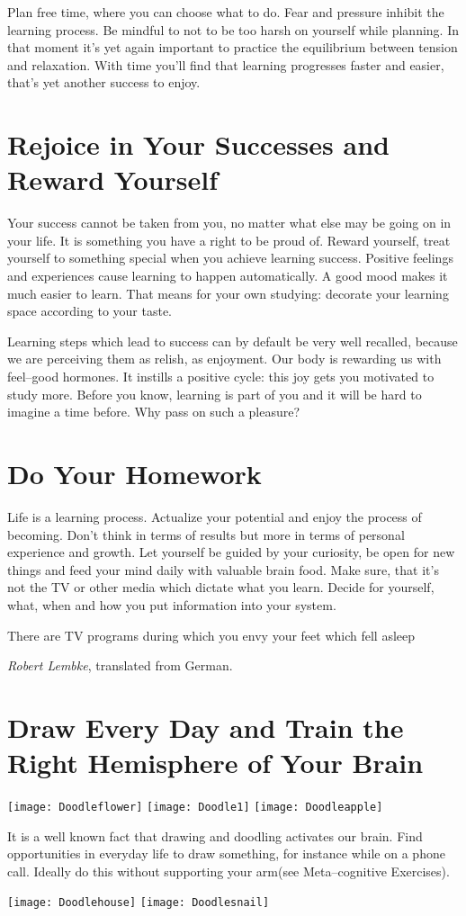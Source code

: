 \documentclass[../main.tex]{subfiles}
\begin{document}
 Plan {free time}, where you can choose what to do. {Fear and pressure inhibit the learning process}. Be mindful to not to be too harsh on yourself while planning. In that moment it's yet again important to practice the equilibrium between tension and relaxation. With time you'll find that learning progresses faster and easier, that's yet another success to enjoy.

 \section[Rejoice and Reward]{Rejoice in Your Successes and Reward Yourself}
 
{Your success cannot be taken from you, no matter what else may be going on in your life.}
It is something you have a right to be proud of. 
 Reward yourself, treat yourself to {something special} when you achieve learning success.
 {Positive feelings and experiences} cause learning to happen automatically.
 A {good mood} makes it much easier to learn. 
That means for your own studying: {decorate your learning space according to your taste.}

Learning steps which lead to success can by default be very well recalled, because we are perceiving them as relish, as enjoyment. Our body is rewarding us with feel--good hormones. It instills a positive cycle: this joy gets you motivated to study more. Before you know, learning is part of you and it will be hard to imagine a time before. Why pass on such a pleasure?

\section{Do Your Homework}

{Life is a learning process}.
{Actualize your potential} and enjoy the process of becoming. 
Don't think in terms of results but more in terms of {personal experience} and {growth}.
Let yourself be guided by your {curiosity}, be {open for new things} and {feed your mind} daily with valuable brain food. 
Make sure, that it's not the TV or other media which dictate what you learn. {Decide for yourself}, what, when and how you put information into your system.

\epigraph{There are TV programs during which you envy your feet which fell asleep}{\textit{Robert Lembke}, translated from German.}

\section[Draw]{Draw Every Day and Train the Right Hemisphere of Your Brain}


\texttt{[image: Doodleflower]}
\texttt{[image: Doodle1]}
\texttt{[image: Doodleapple]}


{It is a well known fact that {drawing} and doodling activates our brain.
  Find opportunities in everyday life to draw something, for instance while on a phone call.  
Ideally do this without supporting your arm}{(see Meta--cognitive Exercises)}.


\texttt{[image: Doodlehouse]}
\texttt{[image: Doodlesnail]}
\end{document}
